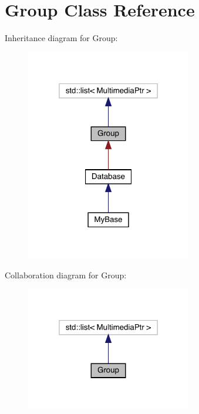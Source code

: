\hypertarget{class_group}{}\section{Group Class Reference}
\label{class_group}


Inheritance diagram for Group\+:
\nopagebreak
\begin{figure}[H]
\begin{center}
\leavevmode
\includegraphics[width=205pt]{class_group__inherit__graph}
\end{center}
\end{figure}


Collaboration diagram for Group\+:
\nopagebreak
\begin{figure}[H]
\begin{center}
\leavevmode
\includegraphics[width=205pt]{class_group__coll__graph}
\end{center}
\end{figure}

